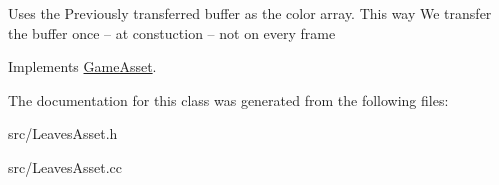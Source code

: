 Uses the Previously transferred buffer as the color array. This way We transfer the buffer once -- at constuction -- not on every frame

Implements \hyperlink{class_game_asset}{Game\+Asset}.



The documentation for this class was generated from the following files\+:\begin{DoxyCompactItemize}
\item 
src/Leaves\+Asset.\+h\item 
src/Leaves\+Asset.\+cc\end{DoxyCompactItemize}
